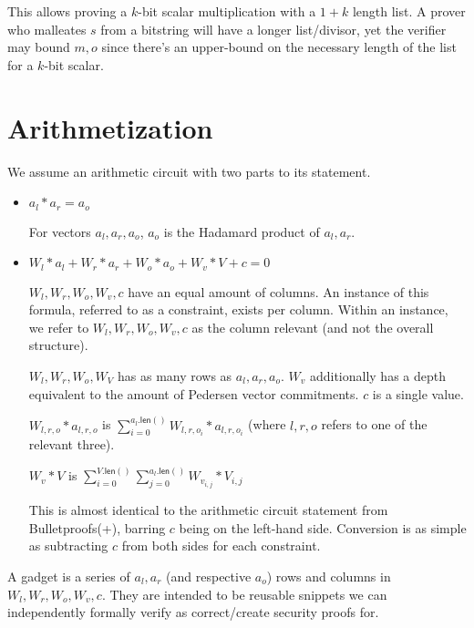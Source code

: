 \documentclass[]{article}
\begin{document}
	This allows proving a $k$-bit scalar multiplication with a $1 + k$ length list. A prover who malleates $s$ from a bitstring will have a longer list/divisor, yet the verifier may bound $m, o$ since there's an upper-bound on the necessary length of the list for a $k$-bit scalar.
	
	\newpage

	\section{Arithmetization}
	
	We assume an arithmetic circuit with two parts to its statement.
	
	\begin{itemize}
		\item
		$a_l * a_r = a_o$
		
		For vectors $a_l, a_r, a_o$, $a_o$ is the Hadamard product of $a_l, a_r$.
		\item
		$W_l * a_l + W_r * a_r + W_o * a_o + W_v * V + c = 0$
		
		$W_l, W_r, W_o, W_v, c$ have an equal amount of columns. An instance of this formula, referred to as a constraint, exists per column. Within an instance, we refer to $W_l, W_r, W_o, W_v, c$ as the column relevant (and not the overall structure).
		
		$W_l, W_r, W_o, W_V$ has as many rows as $a_l, a_r, a_o$. $W_v$ additionally has a depth equivalent to the amount of Pedersen vector commitments. $c$ is a single value.
		
		$W_{l,r,o} * a_{l,r,o}$ is $\sum^{a_l\mathsf{.len}()}_{i=0} W_{l,r,o_i} * a_{l,r,o_i}$ (where $l,r,o$ refers to one of the relevant three).
		
		$W_v * V$ is $\sum^{V\mathsf{.len}()}_{i=0} \sum^{a_l\mathsf{.len}()}_{j=0} W_{v_{i, j}} * V_{i, j}$
		
		This is almost identical to the arithmetic circuit statement from Bulletproofs(+), barring $c$ being on the left-hand side. Conversion is as simple as subtracting $c$ from both sides for each constraint.
	\end{itemize}
	
	A gadget is a series of $a_l, a_r$ (and respective $a_o$) rows and columns in $W_l, W_r, W_o, W_v, c$. They are intended to be reusable snippets we can independently formally verify as correct/create security proofs for.
	
	\newcommand{\p}{\mathsf{.push}}
	\newcommand{\al}{a_l\p}
	\newcommand{\ar}{a_r\p}
	\newcommand{\aol}{\mathsf{a_o.last()}}
	
\end{document}
